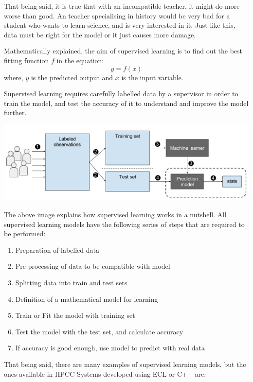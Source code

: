 That being said, it is true that with an incompatible teacher, it might do more worse than good. An teacher specialising in history would be very bad for a student who wants to learn science, and is very interested in it. Just like this, data must be right for the model or it just causes more damage.

Mathematically explained, the aim of supervised learning is to find out the best fitting function $f$ in the equation: \[y=f(x)\] where, $y$ is the predicted output and $x$ is the input variable. 

Supervised learning requires carefully labelled data by a supervisor in order to train the model, and test the accuracy of it to understand and improve the model further.

\includegraphics[width=\columnwidth]{../media/intro/Supervised_machine_learning_in_a_nutshell.svg_.png}

The above image explains how supervised learning works in a nutshell. All supervised learning models have the following series of steps that are required to be performed:

\begin{enumerate}
    \item Preparation of labelled data
    \item Pre-processing of data to be compatible with model
    \item Splitting data into train and test sets
    \item Definition of a mathematical model for learning
    \item Train or Fit the model with training set
    \item Test the model with the test set, and calculate accuracy
    \item If accuracy is good enough, use model to predict with real data
\end{enumerate}

That being said, there are many examples of supervised learning models, but the ones available in HPCC Systems developed using ECL or C++ are: 

